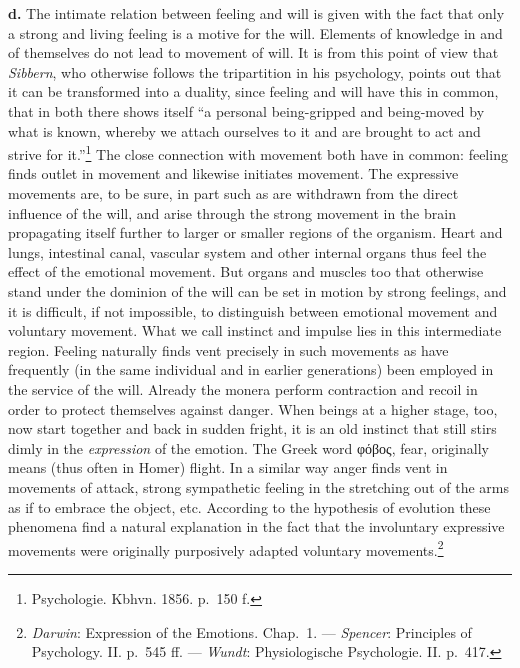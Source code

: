\documentclass[12pt,a4paper]{book}
\newcommand{\opage}[1]{\marginnote{\footnotesize\textit{[#1]}}}
\begin{document}
\textbf{d.} The intimate relation between feeling and will is given with
the fact that only a strong and living feeling is a motive for the will.
Elements of knowledge in and of
\opage{117}themselves do not lead to movement of will. It is from this
point of view that \emph{Sibbern}, who otherwise follows the tripartition
in his psychology, points out that it can be transformed into a duality,
since feeling and will have this in common, that in both there shows
itself ``a personal being-gripped and being-moved by what is known,
whereby we attach ourselves to it and are brought to act and strive for
it.''\footnote{Psychologie. Kbhvn. 1856. p.~150 f.} The close connection
with movement both have in common: feeling finds outlet in movement and
likewise initiates movement. The expressive movements are, to be sure,
in part such as are withdrawn from the direct influence of the will, and
arise through the strong movement in the brain propagating itself further
to larger or smaller regions of the organism. Heart and lungs, intestinal
canal, vascular system and other internal organs thus feel the effect of
the emotional movement. But organs and muscles too that otherwise stand
under the dominion of the will can be set in motion by strong feelings,
and it is difficult, if not impossible, to distinguish between emotional
movement and voluntary movement. What we call instinct and impulse lies
in this intermediate region. Feeling naturally finds vent precisely in
such movements as have frequently (in the same individual and in earlier
generations) been employed in the service of the will. Already the
monera perform contraction and recoil in order to protect themselves
against danger. When beings at a higher stage, too, now start together
and back in sudden fright, it is an old instinct that still stirs dimly
in the \emph{expression} of the emotion. The Greek word φόβος, fear,
originally means (thus often in Homer) flight. In a similar way anger
finds vent in movements of attack, strong sympathetic feeling in the
stretching out of the arms as if to embrace the object, etc. According to
the hypothesis of evolution these phenomena find a natural explanation in
the fact that the involuntary expressive movements were originally
purposively adapted voluntary movements.\footnote{\emph{Darwin}:
Expression of the Emotions. Chap.~1. --- \emph{Spencer}: Principles of
Psychology. II. p.~545 ff. --- \emph{Wundt}: Physiologische Psychologie.
II. p.~417.}
\end{document}
